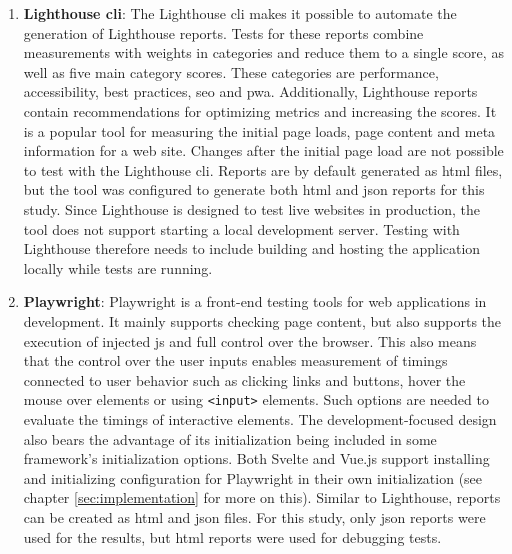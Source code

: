\documentclass[a4paper, 10pt]{article}
\begin{document}
\begin{enumerate}
  \item \textbf{Lighthouse \acrshort{cli}}: The Lighthouse \acrshort{cli} makes it possible to automate the generation of Lighthouse reports.
  Tests for these reports combine measurements with weights in categories and reduce them to a single score, as well as five main category scores.
  These categories are performance, accessibility, best practices, \acrshort{seo} and \acrshort{pwa}.
  Additionally, Lighthouse reports contain recommendations for optimizing metrics and increasing the scores.
  It is a popular tool for measuring the initial page loads, page content and meta information for a web site.
  Changes after the initial page load are not possible to test with the Lighthouse \acrshort{cli}.
  Reports are by default generated as \acrshort{html} files, but the tool was configured to generate both \acrshort{html} and \acrshort{json} reports for this study.
  Since Lighthouse is designed to test live websites in production, the tool does not support starting a local development server.
  Testing with Lighthouse therefore needs to include building and hosting the application locally while tests are running.
  \item \textbf{Playwright}: Playwright is a front-end testing tools for web applications in development.
  It mainly supports checking page content, but also supports the execution of injected \acrlong{js} and full control over the browser.
  This also means that the control over the user inputs enables measurement of timings connected to user behavior such as clicking links and buttons, hover the mouse over elements or using \verb|<input>| elements.
  Such options are needed to evaluate the timings of interactive elements.
  The development-focused design also bears the advantage of its initialization being included in some framework's initialization options.
  Both Svelte and Vue.js support installing and initializing configuration for Playwright in their own initialization (see chapter \ref{sec:implementation} for more on this).
  Similar to Lighthouse, reports can be created as \acrshort{html} and \acrshort{json} files.
  For this study, only \acrshort{json} reports were used for the results, but \acrshort{html} reports were used for debugging tests.
\end{enumerate}
\end{document}
